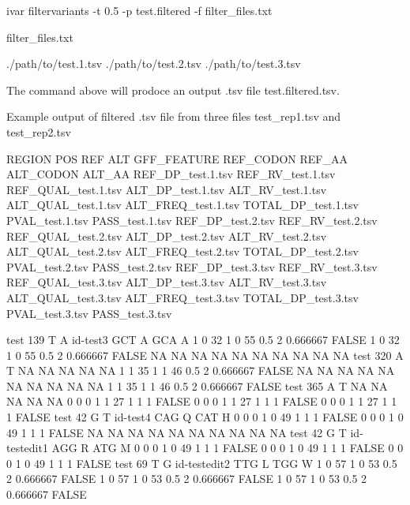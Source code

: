 \begin{DoxyCode}
ivar filtervariants -t 0.5 -p test.filtered -f filter\_files.txt
\end{DoxyCode}


filter\+\_\+files.\+txt 
\begin{DoxyCode}
./path/to/test.1.tsv
./path/to/test.2.tsv
./path/to/test.3.tsv
\end{DoxyCode}


The command above will prodoce an output .tsv file test.\+filtered.\+tsv.

Example output of filtered .tsv file from three files test\+\_\+rep1.\+tsv and test\+\_\+rep2.\+tsv


\begin{DoxyCode}
REGION  POS REF ALT GFF\_FEATURE REF\_CODON   REF\_AA  ALT\_CODON   ALT\_AA  REF\_DP\_test.1.tsv  
       REF\_RV\_test.1.tsv   REF\_QUAL\_test.1.tsv ALT\_DP\_test.1.tsv   ALT\_RV\_test.1.tsv   ALT\_QUAL\_test.1.tsv ALT\_FREQ\_test.1.tsv
       TOTAL\_DP\_test.1.tsv PVAL\_test.1.tsv PASS\_test.1.tsv REF\_DP\_test.2.tsv   REF\_RV\_test.2.tsv   REF\_QUAL\_test.2.tsv
       ALT\_DP\_test.2.tsv   ALT\_RV\_test.2.tsv   ALT\_QUAL\_test.2.tsv ALT\_FREQ\_test.2.tsv TOTAL\_DP\_test.2.tsv
       PVAL\_test.2.tsv PASS\_test.2.tsv REF\_DP\_test.3.tsv   REF\_RV\_test.3.tsv   REF\_QUAL\_test.3.tsv ALT\_DP\_test.3.tsv  
       ALT\_RV\_test.3.tsv   ALT\_QUAL\_test.3.tsv ALT\_FREQ\_test.3.tsv TOTAL\_DP\_test.3.tsv PVAL\_test.3.tsv PASS\_test.3.tsv
       
test    139 T   A   id-test3    GCT A   GCA A   1   0   32  1   0   55  0.5 2   0.666667    FALSE   1   0  
       32  1   0   55  0.5 2   0.666667    FALSE   NA  NA  NA  NA  NA  NA  NA  NA  NA  NA
test    320 A   T   NA  NA  NA  NA  NA  1   1   35  1   1   46  0.5 2   0.666667    FALSE   NA  NA  NA  NA 
       NA  NA  NA  NA  NA  NA  1   1   35  1   1   46  0.5 2   0.666667    FALSE
test    365 A   T   NA  NA  NA  NA  NA  0   0   0   1   1   27  1   1   1   FALSE   0   0   0   1   1   27 
       1   1   1   FALSE   0   0   0   1   1   27  1   1   1   FALSE
test    42  G   T   id-test4    CAG Q   CAT H   0   0   0   1   0   49  1   1   1   FALSE   0   0   0   1  
       0   49  1   1   1   FALSE   NA  NA  NA  NA  NA  NA  NA  NA  NA  NA
test    42  G   T   id-testedit1    AGG R   ATG M   0   0   0   1   0   49  1   1   1   FALSE   0   0   0  
       1   0   49  1   1   1   FALSE   0   0   0   1   0   49  1   1   1   FALSE
test    69  T   G   id-testedit2    TTG L   TGG W   1   0   57  1   0   53  0.5 2   0.666667    FALSE   1  
       0   57  1   0   53  0.5 2   0.666667    FALSE   1   0   57  1   0   53  0.5 2   0.666667    FALSE
\end{DoxyCode}


